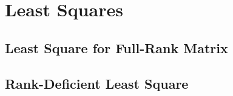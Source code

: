 \documentclass[english]{latex4ei/latex4ei_sheet}
\begin{document}
\section{Least Squares}
\begin{sectionbox}
\subsection{Least Square for Full-Rank Matrix}

\end{sectionbox}
\begin{sectionbox}
	\subsection{Rank-Deficient Least Square}
	
\end{sectionbox}
\end{document}
